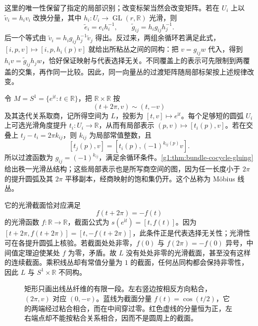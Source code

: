 这里的唯一性保留了指定的局部识别；改变标架当然会改变矩阵。若在 \(U_i\) 上以 \(\widetilde v_i=h_i v_i\) 改换分量，其中 \(h_i:U_i\to\operatorname{GL}(r,\mathbb R)\) 光滑，则
\begin{equation}
	\label{g1:eq:bundle-cocycle-change}
	\widetilde e_i=e_i h_i^{-1},\qquad
	\widetilde g_{ij}=h_i g_{ij}h_j^{-1}.
\end{equation}
后一个等式由 \(\widetilde v_i=h_i g_{ij}h_j^{-1}\widetilde v_j\) 得出。反过来，两组余循环若满足此式，\([i,p,v]\mapsto[i,p,h_i(p)v]\) 就给出所粘丛之间的同构：把 \(v=g_{ij}w\) 代入，得到 \(h_i v=\widetilde g_{ij}h_jw\)，恰好保证映射与代表选择无关。不同覆盖上的表示可先限制到两覆盖的交集，再作同一比较。因此，同一向量丛的过渡矩阵随局部标架按上述规律改变。

\begin{example}[Möbius 线丛]
	\label{g1:exm:mobius-line-bundle}
	令 \(M=S^1=\{e^{\mathrm{i}t}:t\in\mathbb R\}\)，把 \(\mathbb R\times\mathbb R\) 按
	\[
		(t+2\pi,v)\sim(t,-v)
	\]
	及其迭代关系取商，记所得空间为 \(L\)，投影为 \([t,v]\mapsto e^{\mathrm{i}t}\)。每个足够短的圆弧 \(U_i\) 上可选光滑角度提升 \(t_i:U_i\to\mathbb R\)，从而有局部表示 \((p,v)\mapsto[t_i(p),v]\)。若在交叠上 \(t_j-t_i=2\pi k_{ij}\)，则 \(k_{ij}\) 为局部常值整数，且
	\[
		[t_j(p),v]=[t_i(p),(-1)^{k_{ij}(p)}v].
	\]
	所以过渡函数为 \(g_{ij}=(-1)^{k_{ij}}\)，满足余循环条件。\cref{g1:thm:bundle-cocycle-gluing}给出秩一光滑丛结构；这些局部表示也是所写商空间的图，因为任一长度小于 \(2\pi\) 的提升圆弧及其 \(2\pi\) 平移副本，经商映射的饱和集仍开。这个丛称为 Möbius 线丛。

	它的光滑截面恰对应满足
	\begin{equation}
		\label{g1:eq:mobius-section-antiperiodic}
		f(t+2\pi)=-f(t)
	\end{equation}
	的光滑函数 \(f:\mathbb R\to\mathbb R\)，截面公式为 \(s(e^{\mathrm{i}t})=[t,f(t)]\)。因为 \([t+2\pi,f(t+2\pi)]=[t,-f(t+2\pi)]\)，此条件正是代表选择无关性；光滑性可在各提升圆弧上核验。若截面处处非零，\(f(0)\) 与 \(f(2\pi)=-f(0)\) 异号，中间值定理迫使某处 \(f\) 为零，矛盾。故 \(L\) 没有处处非零的光滑截面，甚至没有这样的连续截面。乘积线丛却有常值分量为 \(1\) 的截面，任何丛同构都会保持非零性，因此 \(L\) 与 \(S^1\times\mathbb R\) 不同构。
\end{example}

\begin{figure}[htbp]
	\centering
	
	\caption[Möbius 线丛中的截面与端点粘合]{矩形只画出线丛纤维的有限一段。左右竖边按相反方向粘合，\((2\pi,v)\) 对应 \((0,-v)\)。蓝线为截面分量 \(f(t)=\cos(t/2)\)，它的两端经过粘合相合，而在中间穿过零。红色虚线的分量恒为正，左右端点却不能按粘合关系相合，因而不是圆周上的截面。}
	\label{g1:fig:mobius-section}
\end{figure}

